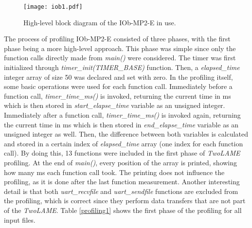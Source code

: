\vspace{0.1cm}

\begin{figure}[H]
\centerline{\texttt{[image: iob1.pdf]}}
\caption{High-level block diagram of the IOb-MP2-E in use.}
\label{fig:newiob1}
\end{figure}

The process of profiling IOb-MP2-E consisted of three phases, with the first phase being a more high-level approach. 
This phase was simple since only the function calls directly made from \textit{main()} were considered. The timer was first initialized through \textit{timer\_init(TIMER\_BASE)} function. Then, a \textit{elapsed\_time} integer array of size 50 was declared and set with zero. In the profiling itself, some basic operations were used for each function call. Immediately before a function call, \textit{timer\_time\_ms()} is invoked, returning the current time in ms which is then stored in \textit{start\_elapse\_time} variable as an unsigned integer. Immediately after a function call, \textit{timer\_time\_ms()} is invoked again, returning the current time in ms which is then stored in \textit{end\_elapse\_time} variable as an unsigned integer as well. Then, the difference between both variables is calculated and stored in a certain index of \textit{elapsed\_time} array (one index for each function call). 
By doing this, 13 functions were included in the first phase of \textit{TwoLAME} profiling. At the end of \textit{main()}, every position of the array is printed, showing how many ms each function call took. The printing does not influence the profiling, as it is done after the last function measurement. Another interesting detail is that both \textit{uart\_recvfile} and \textit{uart\_sendfile} functions are excluded from the profiling, which is correct since they perform data transfers that are not part of the \textit{TwoLAME}.
Table \ref{profiling1} shows the first phase of the profiling for all input files.

